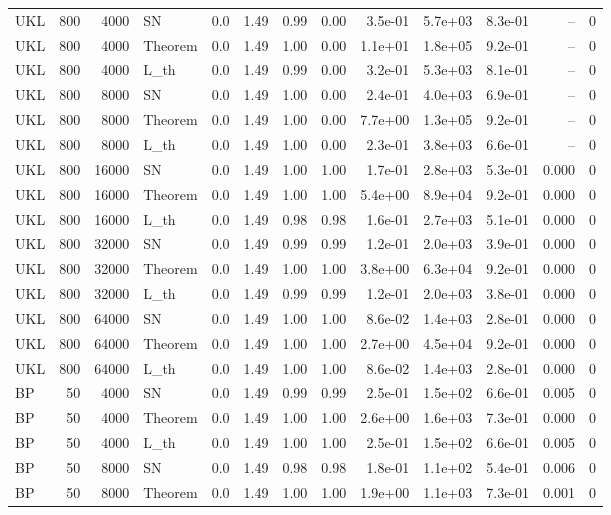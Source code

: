 \begin{tabular}{lrrlrrrrrrrrr}
UKL & 800 & 4000 & SN & 0.0 & 1.49 & 0.99 & 0.00 & 3.5e-01 & 5.7e+03 & 8.3e-01 & -- & 0 \\
UKL & 800 & 4000 & Theorem & 0.0 & 1.49 & 1.00 & 0.00 & 1.1e+01 & 1.8e+05 & 9.2e-01 & -- & 0 \\
UKL & 800 & 4000 & L\_th & 0.0 & 1.49 & 0.99 & 0.00 & 3.2e-01 & 5.3e+03 & 8.1e-01 & -- & 0 \\
UKL & 800 & 8000 & SN & 0.0 & 1.49 & 1.00 & 0.00 & 2.4e-01 & 4.0e+03 & 6.9e-01 & -- & 0 \\
UKL & 800 & 8000 & Theorem & 0.0 & 1.49 & 1.00 & 0.00 & 7.7e+00 & 1.3e+05 & 9.2e-01 & -- & 0 \\
UKL & 800 & 8000 & L\_th & 0.0 & 1.49 & 1.00 & 0.00 & 2.3e-01 & 3.8e+03 & 6.6e-01 & -- & 0 \\
UKL & 800 & 16000 & SN & 0.0 & 1.49 & 1.00 & 1.00 & 1.7e-01 & 2.8e+03 & 5.3e-01 & 0.000 & 0 \\
UKL & 800 & 16000 & Theorem & 0.0 & 1.49 & 1.00 & 1.00 & 5.4e+00 & 8.9e+04 & 9.2e-01 & 0.000 & 0 \\
UKL & 800 & 16000 & L\_th & 0.0 & 1.49 & 0.98 & 0.98 & 1.6e-01 & 2.7e+03 & 5.1e-01 & 0.000 & 0 \\
UKL & 800 & 32000 & SN & 0.0 & 1.49 & 0.99 & 0.99 & 1.2e-01 & 2.0e+03 & 3.9e-01 & 0.000 & 0 \\
UKL & 800 & 32000 & Theorem & 0.0 & 1.49 & 1.00 & 1.00 & 3.8e+00 & 6.3e+04 & 9.2e-01 & 0.000 & 0 \\
UKL & 800 & 32000 & L\_th & 0.0 & 1.49 & 0.99 & 0.99 & 1.2e-01 & 2.0e+03 & 3.8e-01 & 0.000 & 0 \\
UKL & 800 & 64000 & SN & 0.0 & 1.49 & 1.00 & 1.00 & 8.6e-02 & 1.4e+03 & 2.8e-01 & 0.000 & 0 \\
UKL & 800 & 64000 & Theorem & 0.0 & 1.49 & 1.00 & 1.00 & 2.7e+00 & 4.5e+04 & 9.2e-01 & 0.000 & 0 \\
UKL & 800 & 64000 & L\_th & 0.0 & 1.49 & 1.00 & 1.00 & 8.6e-02 & 1.4e+03 & 2.8e-01 & 0.000 & 0 \\
BP & 50 & 4000 & SN & 0.0 & 1.49 & 0.99 & 0.99 & 2.5e-01 & 1.5e+02 & 6.6e-01 & 0.005 & 0 \\
BP & 50 & 4000 & Theorem & 0.0 & 1.49 & 1.00 & 1.00 & 2.6e+00 & 1.6e+03 & 7.3e-01 & 0.000 & 0 \\
BP & 50 & 4000 & L\_th & 0.0 & 1.49 & 1.00 & 1.00 & 2.5e-01 & 1.5e+02 & 6.6e-01 & 0.005 & 0 \\
BP & 50 & 8000 & SN & 0.0 & 1.49 & 0.98 & 0.98 & 1.8e-01 & 1.1e+02 & 5.4e-01 & 0.006 & 0 \\
BP & 50 & 8000 & Theorem & 0.0 & 1.49 & 1.00 & 1.00 & 1.9e+00 & 1.1e+03 & 7.3e-01 & 0.001 & 0 \\

\end{tabular}
